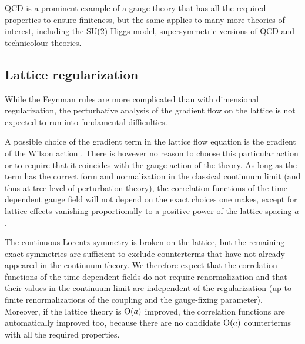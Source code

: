 QCD is a prominent example of a gauge theory that
has all the required properties to ensure finiteness,
but the same applies to many more theories of interest,
including the SU(2) Higgs model,
supersymmetric versions of QCD and technicolour theories.

\subsection{Lattice regularization}

While the Feynman rules are more
complicated than with dimensional regularization,
the perturbative analysis of the gradient flow on the lattice
is not expected to run into fundamental difficulties.

A possible choice of the gradient term
in the lattice flow equation
is the gradient of the Wilson action
\cite{WilsonFlow}.
There is however no reason to choose this particular action
or to require that it coincides with the gauge action
of the theory.
As long as the term has the
correct form and normalization in the classical continuum limit
(and thus at tree-level of perturbation theory),
the correlation functions of the time-dependent gauge field
will not depend on the exact choices one makes, except
for lattice effects vanishing proportionally to a positive power
of the lattice spacing $a$.

The continuous Lorentz symmetry is broken on the lattice,
but the remaining exact symmetries are sufficient to exclude
counterterms that have not already appeared
in the continuum theory.
We therefore expect that the correlation functions
of the time-dependent fields
do not require renormalization and
that their values in the continuum limit
are independent of the regularization
(up to finite renormalizations of
the coupling and the gauge-fixing parameter).
Moreover, if the lattice theory is $\mathrm{O}(a)$ improved,
the correlation functions are automatically improved too,
because there are no candidate $\mathrm{O}(a)$ counterterms
with all the required properties.
